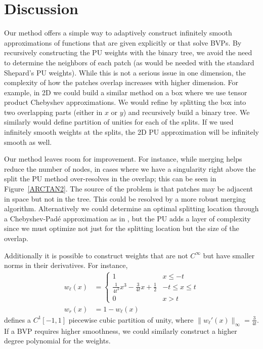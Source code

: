 \section{Discussion}
Our method offers a simple way to adaptively construct infinitely smooth approximations of functions that are given explicitly or that solve BVPs. By recursively constructing the PU weights with the binary tree, we avoid the need to determine the neighbors of each patch (as would be needed with the standard Shepard's PU weights). While this is not a serious issue in one dimension, the complexity of how the patches overlap increases with higher dimension. For example, in 2D we could build a similar method on a box where we use tensor product Chebyshev approximations. We would refine by splitting the box into two overlapping parts (either in $x$ or $y$) and recursively build a binary tree. We similarly would define partition of unities for each of the splits. If we used infinitely smooth weights at the splits, the 2D PU approximation will be infinitely smooth as well.


Our method leaves room for improvement. For instance, while merging helps reduce the number of nodes, in cases where we have a singularity right above the split the PU method over-resolves in the overlap; this can be seen in Figure~\ref{ARCTAN2}. The source of the problem is that patches may be adjacent in space but not in the tree. This could be resolved by a more robust merging algorithm. Alternatively we could determine an optimal splitting location through a Chebyshev-Pad\'{e} approximation as in \cite{driscoll2014optimal}, but the PU adds a layer of complexity since we must optimize not just for the splitting location but the size of the overlap.

Additionally it is possible to construct weights that are not $C^{\infty}$ but have smaller norms in their derivatives. For instance,
\begin{equation}
\begin{aligned}
w_{\ell}(x) &= \begin{cases}
1 & x \leq -t \\
\frac{1}{4t^3} x^3 - \frac{3}{4 t} x+\frac{1}{2} & -t\leq x \leq t \\
0 & x>t
 \end{cases} \\
 w_{r}(x) &= 1-w_{\ell}(x)
\end{aligned}
\end{equation}
defines a $C^1[-1,1]$ piecewise cubic partition of unity, where $\| w_{\ell}'(x)\|_{\infty} = \frac{3}{4t}$. If a BVP requires higher smoothness, we could similarly construct a higher degree polynomial for the weights.
